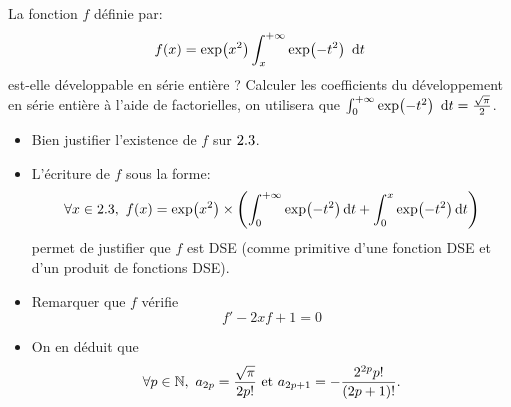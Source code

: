 \begin{exercice}  
    La fonction $f$ définie par:
    $$f(x) = \exp(x^2) \int_{x}^{+ \infty} \exp(-t^2)\ \, \mathrm{d} t$$
    est-elle développable en série entière ? Calculer les coefficients du développement en série entière à l'aide de factorielles, on utilisera que $\int_{0}^{+\infty} \exp(-t^2)\ \, \mathrm{d} t = \frac{\sqrt{\pi}}{2}$. 
\end{exercice}

\begin{itemize}
    \item Bien justifier l'existence de $f$ sur $2.3$.
    \item L'écriture de $f$ sous la forme:
    $$\forall x \in 2.3,\ f(x) = \exp(x^2) \times \left(\int_{0}^{+ \infty} \exp(-t^2) \, \mathrm{d} t + \int_{0}^{x} \exp(-t^2) \, \mathrm{d} t\right)$$
    permet de justifier que $f$ est DSE (comme primitive d'une fonction DSE et d'un produit de fonctions DSE).
    \item Remarquer que $f$ vérifie
    $$f' -2xf + 1 = 0$$
    \item On en déduit que 
    $$\forall p \in \N,\ a_{2p} = \frac{\sqrt{\pi}}{2p!} \text{ et } a_{2p+1} = -\frac{2^{2p} p!}{(2p+1)!}.$$
\end{itemize}

